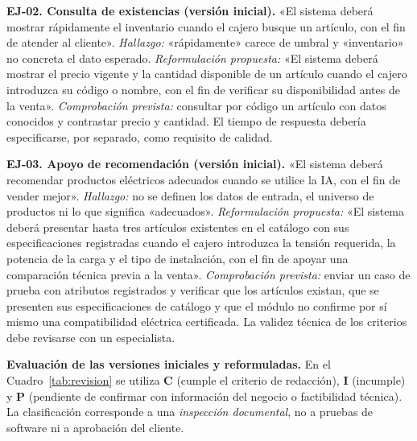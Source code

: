 \documentclass[onecolumn,12pt,a4paper]{IEEEtran}
\begin{document}
\textbf{EJ-02. Consulta de existencias (versión inicial).} «El sistema deberá mostrar rápidamente el inventario cuando el cajero busque un artículo, con el fin de atender al cliente». \emph{Hallazgo:} «rápidamente» carece de umbral y «inventario» no concreta el dato esperado. \emph{Reformulación propuesta:} «El sistema deberá mostrar el precio vigente y la cantidad disponible de un artículo cuando el cajero introduzca su código o nombre, con el fin de verificar su disponibilidad antes de la venta». \emph{Comprobación prevista:} consultar por código un artículo con datos conocidos y contrastar precio y cantidad. El tiempo de respuesta debería especificarse, por separado, como requisito de calidad.

\textbf{EJ-03. Apoyo de recomendación (versión inicial).} «El sistema deberá recomendar productos eléctricos adecuados cuando se utilice la IA, con el fin de vender mejor». \emph{Hallazgo:} no se definen los datos de entrada, el universo de productos ni lo que significa «adecuados». \emph{Reformulación propuesta:} «El sistema deberá presentar hasta tres artículos existentes en el catálogo con sus especificaciones registradas cuando el cajero introduzca la tensión requerida, la potencia de la carga y el tipo de instalación, con el fin de apoyar una comparación técnica previa a la venta». \emph{Comprobación prevista:} enviar un caso de prueba con atributos registrados y verificar que los artículos existan, que se presenten sus especificaciones de catálogo y que el módulo no confirme por sí mismo una compatibilidad eléctrica certificada. La validez técnica de los criterios debe revisarse con un especialista.

\noindent\textbf{Evaluación de las versiones iniciales y reformuladas.} En el Cuadro~\ref{tab:revision} se utiliza \textbf{C} (cumple el criterio de redacción), \textbf{I} (incumple) y \textbf{P} (pendiente de confirmar con información del negocio o factibilidad técnica). La clasificación corresponde a una \emph{inspección documental}, no a pruebas de software ni a aprobación del cliente.
\end{document}
